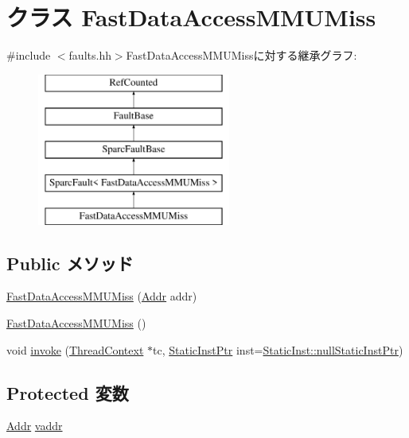 \hypertarget{classSparcISA_1_1FastDataAccessMMUMiss}{
\section{クラス FastDataAccessMMUMiss}
\label{classSparcISA_1_1FastDataAccessMMUMiss}
}


{\ttfamily \#include $<$faults.hh$>$}FastDataAccessMMUMissに対する継承グラフ:\begin{figure}[H]
\begin{center}
\leavevmode
\includegraphics[height=5cm]{classSparcISA_1_1FastDataAccessMMUMiss}
\end{center}
\end{figure}
\subsection*{Public メソッド}
\begin{DoxyCompactItemize}
\item 
\hyperlink{classSparcISA_1_1FastDataAccessMMUMiss_ae1de78aee4b4b1ac010519d262644296}{FastDataAccessMMUMiss} (\hyperlink{base_2types_8hh_af1bb03d6a4ee096394a6749f0a169232}{Addr} addr)
\item 
\hyperlink{classSparcISA_1_1FastDataAccessMMUMiss_ae2db95fae027a44a26e71d3a874f61ae}{FastDataAccessMMUMiss} ()
\item 
void \hyperlink{classSparcISA_1_1FastDataAccessMMUMiss_a2bd783b42262278d41157d428e1f8d6f}{invoke} (\hyperlink{classThreadContext}{ThreadContext} $\ast$tc, \hyperlink{classRefCountingPtr}{StaticInstPtr} inst=\hyperlink{classStaticInst_aa793d9793af735f09096369fb17567b6}{StaticInst::nullStaticInstPtr})
\end{DoxyCompactItemize}
\subsection*{Protected 変数}
\begin{DoxyCompactItemize}
\item 
\hyperlink{base_2types_8hh_af1bb03d6a4ee096394a6749f0a169232}{Addr} \hyperlink{classSparcISA_1_1FastDataAccessMMUMiss_a9f933b300ef63eea367ca82f8da31025}{vaddr}
\end{DoxyCompactItemize}


